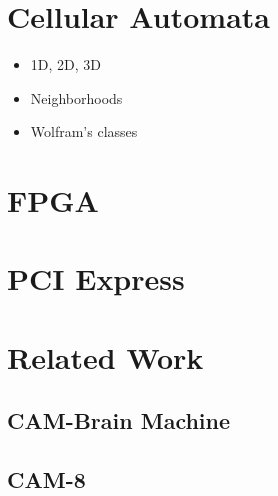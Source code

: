 \section{Cellular Automata}

\TODO

\begin{itemize}
    \item 1D, 2D, 3D
    \item Neighborhoods
    \item Wolfram's classes
\end{itemize}

\section{FPGA}

\TODO

\section{PCI Express}

\TODO

\section{Related Work}

\TODO

\subsection{CAM-Brain Machine}

\TODO

\subsection{CAM-8}

\TODO
